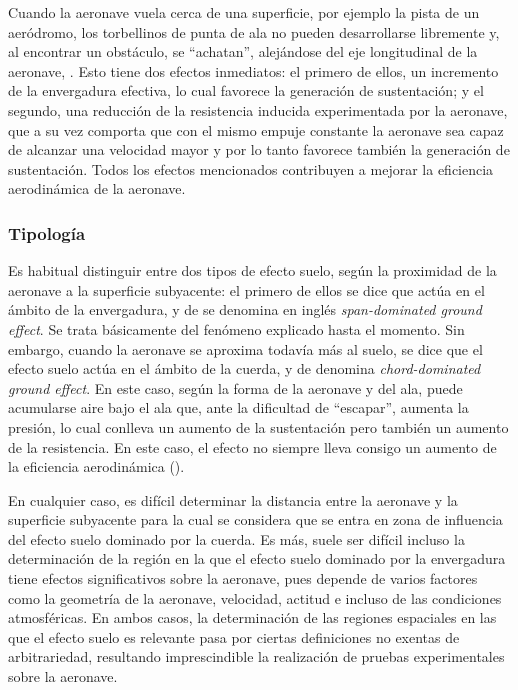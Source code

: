 Cuando la aeronave vuela cerca de una superficie, por ejemplo la pista de un aeródromo, los torbellinos de punta de ala no pueden desarrollarse libremente y, al encontrar un obstáculo, se “achatan”, alejándose del eje longitudinal de la aeronave, . Esto tiene dos efectos inmediatos: el primero de ellos, un incremento de la envergadura efectiva, lo cual favorece la generación de sustentación; y el segundo, una reducción de la resistencia inducida experimentada por la aeronave, que a su vez comporta que con el mismo empuje constante la aeronave sea capaz de alcanzar una velocidad mayor y por lo tanto favorece también la generación de sustentación. Todos los efectos mencionados contribuyen a mejorar la eficiencia aerodinámica de la aeronave.


\subsubsection{Tipología}
\label{sec:wig:ge:tipology}

Es habitual distinguir entre dos tipos de efecto suelo, según la proximidad de la aeronave a la superficie subyacente: el primero de ellos se dice que actúa en el ámbito de la envergadura, y de se denomina en inglés \emph{span-dominated ground effect}. Se trata básicamente del fenómeno explicado hasta el momento. Sin embargo, cuando la aeronave se aproxima todavía más al suelo, se dice que el efecto suelo actúa en el ámbito de la cuerda, y de denomina \emph{chord-dominated ground effect}. En este caso, según la forma de la aeronave y del ala, puede acumularse aire bajo el ala que, ante la dificultad de “escapar”, aumenta la presión, lo cual conlleva un aumento de la sustentación pero también un aumento de la resistencia. En este caso, el efecto no siempre lleva consigo un aumento de la eficiencia aerodinámica ().

En cualquier caso, es difícil determinar la distancia entre la aeronave y la superficie subyacente para la cual se considera que se entra en zona de influencia del efecto suelo dominado por la cuerda. Es más, suele ser difícil incluso la determinación de la región en la que el efecto suelo dominado por la envergadura tiene efectos significativos sobre la aeronave, pues depende de varios factores como la geometría de la aeronave, velocidad, actitud e incluso de las condiciones atmosféricas. En ambos casos, la determinación de las regiones espaciales en las que el efecto suelo es relevante pasa por ciertas definiciones no exentas de arbitrariedad, resultando imprescindible la realización de pruebas experimentales sobre la aeronave.


